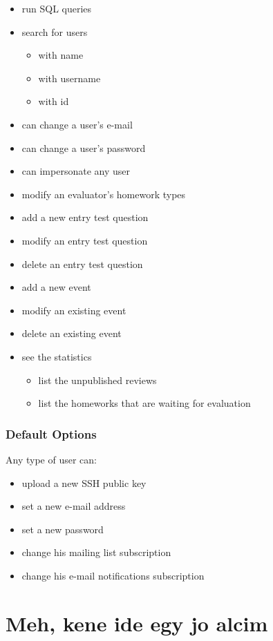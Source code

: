 \begin{itemize}
	\item run SQL queries
	\item search for users
	\begin{itemize}
		\item with name
		\item with username
		\item with id
	\end{itemize}
	\item can change a user's e-mail
	\item can change a user's password
	\item can impersonate any user
	\item modify an evaluator's homework types
	\item add a new entry test question
	\item modify an entry test question
	\item delete an entry test question
	\item add a new event
	\item modify an existing event
	\item delete an existing event
	\item see the statistics
	\begin{itemize}
		\item list the unpublished reviews
		\item list the homeworks that are waiting for evaluation
	\end{itemize}
\end{itemize}

\subsubsection{Default Options}

Any type of user can:

\begin{itemize}
	\item upload a new SSH public key
	\item set a new e-mail address
	\item set a new password
	\item change his mailing list subscription
	\item change his e-mail notifications subscription
\end{itemize}

\section{Meh, kene ide egy jo alcim}



